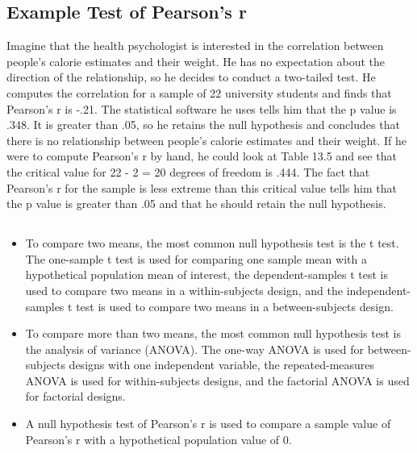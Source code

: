\subsection{Example Test of Pearson's r}

Imagine that the health psychologist is interested in the correlation between people's calorie estimates and their weight. He has no expectation about the direction of the relationship, so he decides to conduct a two-tailed test. He computes the correlation for a sample of 22 university students and finds that Pearson's r is -.21. The statistical software he uses tells him that the p value is .348. It is greater than .05, so he retains the null hypothesis and concludes that there is no relationship between people's calorie estimates and their weight. If he were to compute Pearson's r by hand, he could look at Table 13.5 and see that the critical value for 22 - 2 = 20 degrees of freedom is .444. The fact that Pearson's r for the sample is less extreme than this critical value tells him that the p value is greater than .05 and that he should retain the null hypothesis.


\subsection{}
\begin{fullwidth}
\begin{itemize}
\item To compare two means, the most common null hypothesis test is the t test. The one-sample t test is used for comparing one sample mean with a hypothetical population mean of interest, the dependent-samples t test is used to compare two means in a within-subjects design, and the independent-samples t test is used to compare two means in a between-subjects design.

\item To compare more than two means, the most common null hypothesis test is the analysis of variance (ANOVA). The one-way ANOVA is used for between-subjects designs with one independent variable, the repeated-measures ANOVA is used for within-subjects designs, and the factorial ANOVA is used for factorial designs.

\item A null hypothesis test of Pearson's r is used to compare a sample value of Pearson's r with a hypothetical population value of 0.

\end{itemize}
\end{fullwidth}


